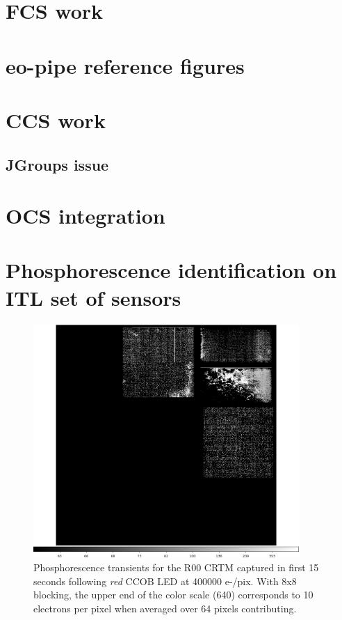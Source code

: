 \appendix

\section{FCS work}

\section{eo-pipe reference figures}

\section{CCS work}
\subsection{JGroups issue}

\section{OCS integration}

\section{Phosphorescence identification on ITL set of sensors}

\begin{figure}[!htbp]
\centering
\includegraphics[width=0.9\textwidth]{sections/figures/phosphorescence-survey/itl_fluor_R00_0-19_rb1_log.png}
\caption{Phosphorescence transients for the R00 CRTM captured in first 15 seconds following {\it red} CCOB LED at 400000 e-/pix. With 8x8 blocking, the upper end of the color scale (640) corresponds to 10 electrons per pixel when averaged over 64 pixels contributing.}
\label{fig:phos:R00}
\end{figure}

